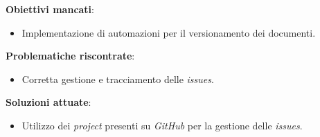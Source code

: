 \textbf{Obiettivi mancati}:
\begin{itemize}
	\item Implementazione di automazioni per il versionamento dei documenti.
\end{itemize}

\textbf{Problematiche riscontrate}:
\begin{itemize}
	\item Corretta gestione e tracciamento delle \textit{issues}.
\end{itemize}

\textbf{Soluzioni attuate}:
\begin{itemize}
	\item Utilizzo dei \textit{project} presenti su \textit{GitHub} per la gestione delle \textit{issues}.
\end{itemize}






